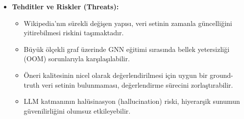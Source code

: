 \begin{itemize}
    \item \textbf{Tehditler ve Riskler (Threats):}
    \begin{itemize}
        \item Wikipedia'nın sürekli değişen yapısı, veri setinin zamanla güncelliğini yitirebilmesi riskini taşımaktadır.
        \item Büyük ölçekli graf üzerinde GNN eğitimi sırasında bellek yetersizliği (OOM) sorunlarıyla karşılaşılabilir.
        \item Öneri kalitesinin nicel olarak değerlendirilmesi için uygun bir ground-truth veri setinin bulunmaması, değerlendirme sürecini zorlaştırabilir.
        \item LLM katmanının halüsinasyon (hallucination) riski, hiyerarşik sunumun güvenilirliğini olumsuz etkileyebilir.
    \end{itemize}
\end{itemize}